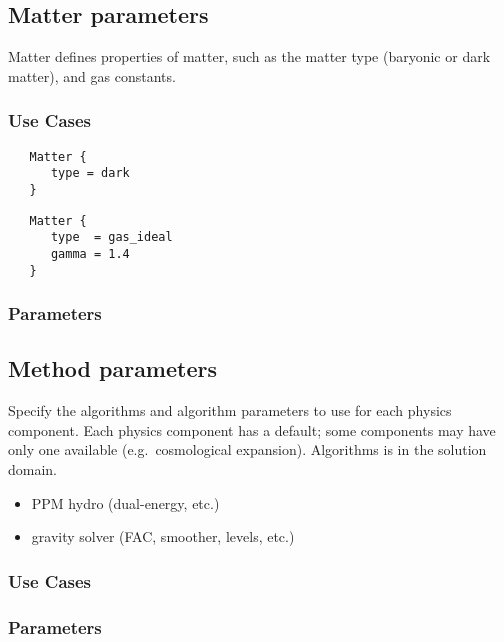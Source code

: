 \subsection{Matter parameters} \label{s:params-matter}

 Matter defines properties of matter, such as the matter type (baryonic
 or dark matter), and gas constants.

\subsubsection{Use Cases}

\begin{verbatim}
   Matter {
      type = dark
   }
\end{verbatim}

\begin{verbatim}
   Matter {
      type  = gas_ideal
      gamma = 1.4
   }
\end{verbatim}

\subsubsection{Parameters}

\subsection{Method parameters}

 Specify the algorithms and algorithm parameters
 to use for each physics component.  Each physics component has a
 default; some components may have only one available
 (e.g.~cosmological expansion).  Algorithms is in the solution domain.

\begin{itemize}
\item PPM hydro (dual-energy, etc.)
\item gravity solver (FAC, smoother, levels, etc.)
\end{itemize}

\subsubsection{Use Cases}
\subsubsection{Parameters}

